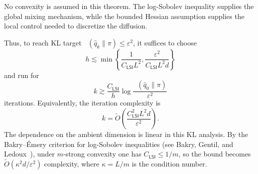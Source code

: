 \documentclass{amsart}
\numberwithin{equation}{section}
\theoremstyle{plain}
\theoremstyle{definition}
\theoremstyle{remark}
\DeclareMathOperator{\KL}{D_{\mathsf{KL}}}
\newcommand{\wh}[1]{\widehat{#1}}
\newcommand{\deltaerr}{\varepsilon}
\newcommand{\tO}{\widetilde O}
\begin{document}
No convexity is assumed in this theorem.  The log-Sobolev inequality supplies
the global mixing mechanism, while the bounded Hessian assumption supplies the
local control needed to discretize the diffusion.

Thus, to reach KL target
$\KL(\wh q_k\|\pi)\leq \deltaerr^2$, it suffices to choose
\[
    h\lesssim
    \min\left\{
    \frac{1}{C_{\mathsf{LSI}}L^2},
    \frac{\deltaerr^2}{C_{\mathsf{LSI}}L^2d}
    \right\}
\]
and run for
\[
    k
    \gtrsim
    \frac{C_{\mathsf{LSI}}}{h}
    \log\frac{\KL(\wh q_0\|\pi)}{\deltaerr^2}
\]
iterations.  Equivalently, the iteration complexity is
\[
    k=\tO\!\left(
    \frac{C_{\mathsf{LSI}}^2L^2d}{\deltaerr^2}
    \right).
\]
The dependence on the ambient dimension is linear in this KL analysis.  By the
Bakry--\'Emery criterion for log-Sobolev inequalities (see Bakry, Gentil, and
Ledoux~\cite{bakry2014analysis}), under $m$-strong convexity one has
$C_{\mathsf{LSI}}\leq 1/m$, so the bound becomes
$\tO(\kappa^2d/\deltaerr^2)$ complexity, where $\kappa=L/m$ is the condition number.
\end{document}
